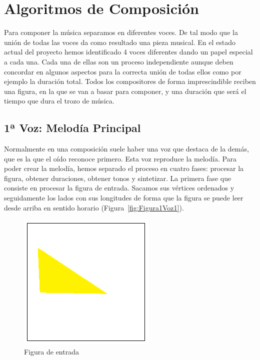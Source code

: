 \section{Algoritmos de Composición}
\label{sec:algComposicion}

Para componer la música separamos en diferentes voces. De tal modo que la unión de todas las voces da como resultado una pieza musical. En el estado actual del proyecto hemos identificado 4 voces diferentes dando un papel especial a cada una. Cada una de ellas son un proceso independiente aunque deben concordar en algunos aspectos para la correcta unión de todas ellos como por ejemplo la duración total. Todos los compositores de forma imprescindible reciben una figura, en la que se van a basar para componer, y una duración que será el tiempo que dura el trozo de música.

\subsection{1ª Voz: Melodía Principal}

Normalmente en una composición suele haber una voz que destaca de la demás, que es la que el oído reconoce primero. Esta voz reproduce la melodía. Para poder crear la melodía, hemos separado el proceso en cuatro fases: procesar la figura, obtener duraciones, obtener tonos y sintetizar. 
La primera fase que consiste en procesar la figura de entrada. Sacamos sus vértices ordenados y seguidamente los lados con sus longitudes de forma que la figura se puede leer desde arriba en sentido horario (Figura~\ref{fig:Figura1Voz1}).

		\begin{figure}[htbp]
		\centering
		\hspace*{0.0in}
		\includegraphics[scale=1.0]{graphics/simpletest1.png}
		\caption{Figura de entrada}
		\label{fig:Figura0Voz1}
		\end{figure}

